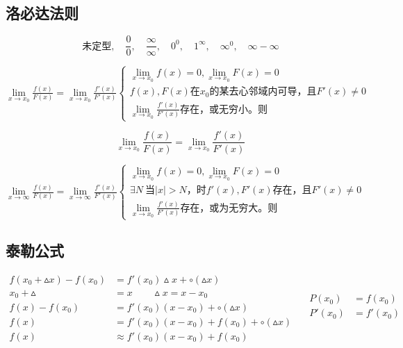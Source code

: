 \subsection{洛必达法则}
$$\mbox{未定型},\quad\frac{0}{0},\quad\frac{\infty}{\infty},\quad0^0,\quad1^\infty,\quad\infty^0,\quad\infty-\infty$$
\begin{center}
    $\lim\limits_{x\to x_0}\frac{f(x)}{F(x)}=\lim\limits_{x\to x_0}\frac{f'(x)}{F'(x)}\begin{cases}
    \lim\limits_{x\to x_0}f(x)=0,\lim\limits_{x\to x_0}F(x)=0\\
    f(x),F(x)\mbox{在}x_0\mbox{的某去心邻域内可导，且}F'(x)\neq 0\\
    \lim\limits_{x\to x_0}\frac{f'(x)}{F'(x)}\mbox{存在，或无穷小。则}
\end{cases}$
\end{center}
\begin{equation}
    \lim\limits_{x\to x_0}\frac{f(x)}{F(x)}=\lim\limits_{x\to x_0}\frac{f'(x)}{F'(x)}\label{l'hospital rule}
\end{equation}
    \begin{center}
        $\lim\limits_{x\to \infty}\frac{f(x)}{F(x)}=\lim\limits_{x\to \infty}\frac{f'(x)}{F'(x)}\begin{cases}
        \lim\limits_{x\to x_0}f(x)=0,\lim\limits_{x\to x_0}F(x)=0\\
        \exists N\ \mbox{当}\left|x\right|>N\mbox{，时}f'(x),F'(x)\mbox{存在，且}F'(x)\neq 0\\
        \lim\limits_{x\to x_0}\frac{f'(x)}{F'(x)}\mbox{存在，或为无穷大。则}
    \end{cases}$
\end{center}
\subsection{泰勒公式}
\begin{displaymath}
    \begin{split}
        f(x_0+\vartriangle x)-f(x_0)&=f'(x_0)\vartriangle x +\circ (\vartriangle x)\\
        x_0+\vartriangle &= x \qquad \vartriangle x= x-x_0\\
        f(x)-f(x_0)&=f'(x_0)(x-x_0) +\circ (\vartriangle x)\\
        f(x)&=f'(x_0)(x-x_0)+f(x_0)+\circ (\vartriangle x)\\
        f(x)&\approx f'(x_0)(x-x_0)+f(x_0)
    \end{split}\quad
    \begin{split}
        P(x_0)&=f(x_0) \\
        P'(x_0)&=f'(x_0)\\
    \end{split}
\end{displaymath}
